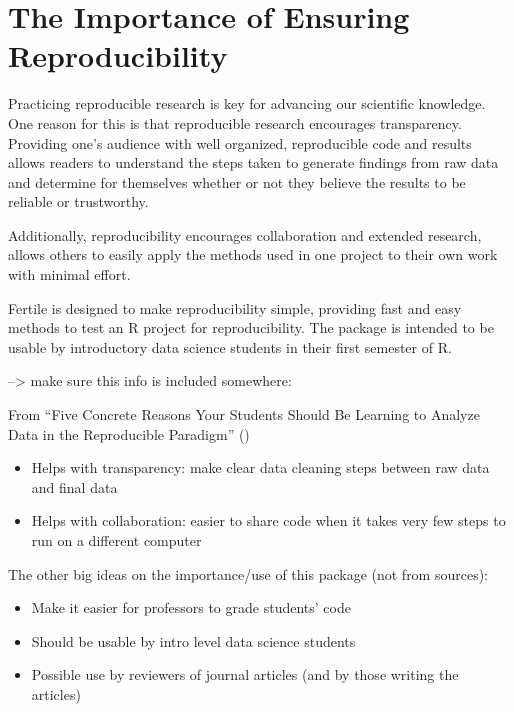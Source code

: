 \documentclass[12pt]{article}
\providecommand{\tightlist}{%
  \setlength{\itemsep}{0pt}\setlength{\parskip}{0pt}}
\begin{document}
\section{The Importance of Ensuring
Reproducibility}\label{the-importance-of-ensuring-reproducibility}

Practicing reproducible research is key for advancing our scientific
knowledge. One reason for this is that reproducible research encourages
transparency. Providing one's audience with well organized, reproducible
code and results allows readers to understand the steps taken to
generate findings from raw data and determine for themselves whether or
not they believe the results to be reliable or trustworthy.

Additionally, reproducibility encourages collaboration and extended
research, allows others to easily apply the methods used in one project
to their own work with minimal effort. \citet{bray2014five}

Fertile is designed to make reproducibility simple, providing fast and
easy methods to test an R project for reproducibility. The package is
intended to be usable by introductory data science students in their
first semester of R.

--\textgreater{} make sure this info is included somewhere:

From ``Five Concrete Reasons Your Students Should Be Learning to Analyze
Data in the Reproducible Paradigm'' (\citet{bray2014five})

\begin{itemize}
\tightlist
\item
  Helps with transparency: make clear data cleaning steps between raw
  data and final data
\item
  Helps with collaboration: easier to share code when it takes very few
  steps to run on a different computer
\end{itemize}

The other big ideas on the importance/use of this package (not from
sources):

\begin{itemize}
\tightlist
\item
  Make it easier for professors to grade students' code
\item
  Should be usable by intro level data science students
\item
  Possible use by reviewers of journal articles (and by those writing
  the articles)
\end{itemize}
\end{document}
